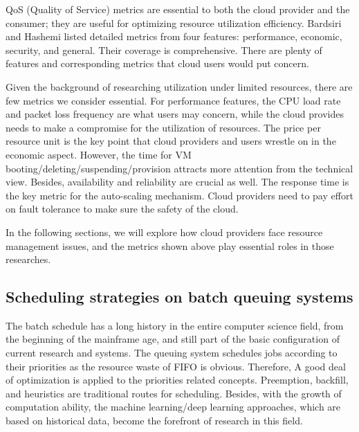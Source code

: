 \documentclass[sigchi]{acmart}
\begin{document}
QoS (Quality of Service) metrics are essential to both the cloud provider and the consumer; they are useful for optimizing resource utilization efficiency.
Bardsiri and Hashemi listed detailed metrics from four features: performance, economic, security, and general. \cite{Bardsiri2014}
Their coverage is comprehensive. There are plenty of features and corresponding metrics that cloud users would put concern.

Given the background of researching utilization under limited resources, there are few metrics we consider essential. 
For performance features, the CPU load rate and packet loss frequency are what users may concern, while the cloud provides needs to make a compromise for the utilization of resources.
The price per resource unit is the key point that cloud providers and users wrestle on in the economic aspect. However, the time for VM booting/deleting/suspending/provision attracts more attention from the technical view.
Besides, availability and reliability are crucial as well. The response time is the key metric for the auto-scaling mechanism.
Cloud providers need to pay effort on fault tolerance to make sure the safety of the cloud.

In the following sections, we will explore how cloud providers face resource management issues, and the metrics shown above play essential roles in those researches.

\subsection{Scheduling strategies on batch queuing systems }
The batch schedule has a long history in the entire computer science field, from the beginning of the mainframe age, and still part of the basic configuration of current research and systems.
The queuing system schedules jobs according to their priorities as the resource waste of FIFO is obvious. Therefore, A good deal of optimization is applied to the priorities related concepts.
Preemption, backfill, and heuristics are traditional routes for scheduling. Besides, with the growth of computation ability, the machine learning/deep learning approaches, which are based on historical data, become the forefront of research in this field.
\end{document}
